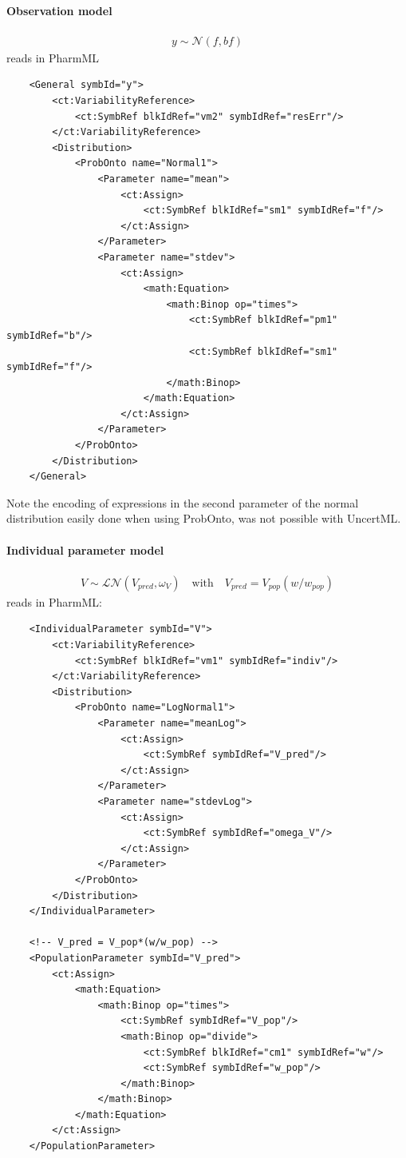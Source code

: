\paragraph{Observation model}
\begin{align*}
 y \sim \mathcal N(f,b f)
\end{align*}
reads in PharmML
\lstset{language=XML}
\begin{lstlisting}
    <General symbId="y">
        <ct:VariabilityReference>
            <ct:SymbRef blkIdRef="vm2" symbIdRef="resErr"/>
        </ct:VariabilityReference>
        <Distribution>
            <ProbOnto name="Normal1">
                <Parameter name="mean">
                    <ct:Assign>
                        <ct:SymbRef blkIdRef="sm1" symbIdRef="f"/>
                    </ct:Assign>
                </Parameter>
                <Parameter name="stdev">
                    <ct:Assign>
                        <math:Equation>
                            <math:Binop op="times">
                                <ct:SymbRef blkIdRef="pm1" symbIdRef="b"/>
                                <ct:SymbRef blkIdRef="sm1" symbIdRef="f"/>
                            </math:Binop>
                        </math:Equation>
                    </ct:Assign>
                </Parameter>
            </ProbOnto>
        </Distribution>
    </General>
\end{lstlisting}
Note the encoding of expressions in the second parameter of the normal distribution
easily done when using ProbOnto, was not possible with UncertML.
\paragraph{Individual parameter model} 
\begin{align*}
 V \sim \mathcal {LN}(V_{pred}, \omega_V) \quad \text{with} \quad V_{pred}=V_{pop} (w/w_{pop})
\end{align*}
reads in PharmML:
\lstset{language=XML}
\begin{lstlisting}
    <IndividualParameter symbId="V">
        <ct:VariabilityReference>
            <ct:SymbRef blkIdRef="vm1" symbIdRef="indiv"/>
        </ct:VariabilityReference>
        <Distribution>
            <ProbOnto name="LogNormal1">
                <Parameter name="meanLog">
                    <ct:Assign>
                        <ct:SymbRef symbIdRef="V_pred"/>
                    </ct:Assign>
                </Parameter>
                <Parameter name="stdevLog">
                    <ct:Assign>
                        <ct:SymbRef symbIdRef="omega_V"/>
                    </ct:Assign>
                </Parameter>
            </ProbOnto>
        </Distribution>
    </IndividualParameter>

    <!-- V_pred = V_pop*(w/w_pop) -->
    <PopulationParameter symbId="V_pred">
        <ct:Assign>
            <math:Equation>
                <math:Binop op="times">
                    <ct:SymbRef symbIdRef="V_pop"/>
                    <math:Binop op="divide">
                        <ct:SymbRef blkIdRef="cm1" symbIdRef="w"/>
                        <ct:SymbRef symbIdRef="w_pop"/>
                    </math:Binop>
                </math:Binop>
            </math:Equation>
        </ct:Assign>
    </PopulationParameter>
\end{lstlisting}
